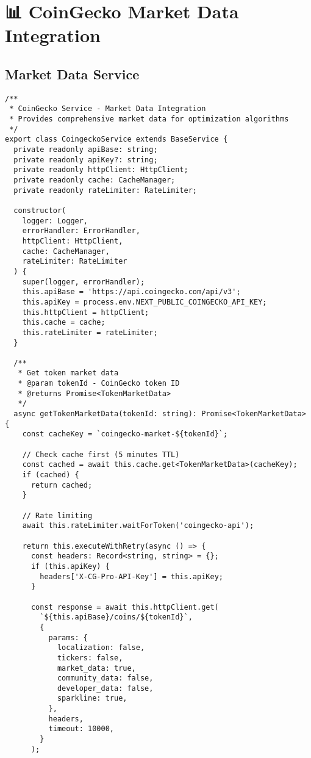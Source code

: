 \documentclass[11pt,a4paper]{article}
\begin{document}
\section{📊 CoinGecko Market Data Integration}

\subsection{Market Data Service}

\begin{lstlisting}[style=typescript, caption=CoinGecko Service for Market Data]
/**
 * CoinGecko Service - Market Data Integration
 * Provides comprehensive market data for optimization algorithms
 */
export class CoingeckoService extends BaseService {
  private readonly apiBase: string;
  private readonly apiKey?: string;
  private readonly httpClient: HttpClient;
  private readonly cache: CacheManager;
  private readonly rateLimiter: RateLimiter;

  constructor(
    logger: Logger,
    errorHandler: ErrorHandler,
    httpClient: HttpClient,
    cache: CacheManager,
    rateLimiter: RateLimiter
  ) {
    super(logger, errorHandler);
    this.apiBase = 'https://api.coingecko.com/api/v3';
    this.apiKey = process.env.NEXT_PUBLIC_COINGECKO_API_KEY;
    this.httpClient = httpClient;
    this.cache = cache;
    this.rateLimiter = rateLimiter;
  }

  /**
   * Get token market data
   * @param tokenId - CoinGecko token ID
   * @returns Promise<TokenMarketData>
   */
  async getTokenMarketData(tokenId: string): Promise<TokenMarketData> {
    const cacheKey = `coingecko-market-${tokenId}`;
    
    // Check cache first (5 minutes TTL)
    const cached = await this.cache.get<TokenMarketData>(cacheKey);
    if (cached) {
      return cached;
    }

    // Rate limiting
    await this.rateLimiter.waitForToken('coingecko-api');

    return this.executeWithRetry(async () => {
      const headers: Record<string, string> = {};
      if (this.apiKey) {
        headers['X-CG-Pro-API-Key'] = this.apiKey;
      }

      const response = await this.httpClient.get(
        `${this.apiBase}/coins/${tokenId}`,
        {
          params: {
            localization: false,
            tickers: false,
            market_data: true,
            community_data: false,
            developer_data: false,
            sparkline: true,
          },
          headers,
          timeout: 10000,
        }
      );


\end{lstlisting}
\end{document}
